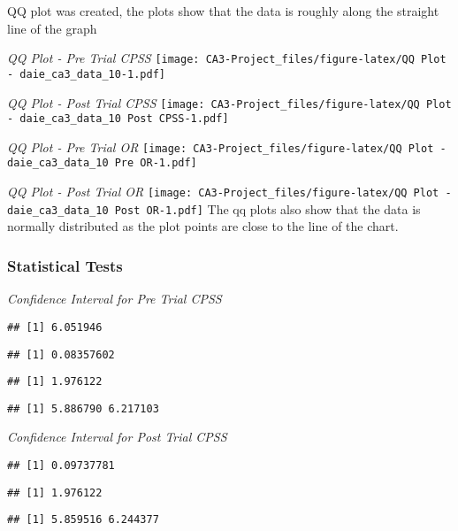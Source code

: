 \documentclass[
]{article}
\begin{document}
QQ plot was created, the plots show that the data is roughly along the
straight line of the graph

\emph{QQ Plot - Pre Trial CPSS}
\texttt{[image: CA3-Project\_files/figure-latex/QQ Plot - daie\_ca3\_data\_10-1.pdf]}

\emph{QQ Plot - Post Trial CPSS}
\texttt{[image: CA3-Project\_files/figure-latex/QQ Plot - daie\_ca3\_data\_10 Post CPSS-1.pdf]}

\emph{QQ Plot - Pre Trial OR}
\texttt{[image: CA3-Project\_files/figure-latex/QQ Plot - daie\_ca3\_data\_10 Pre OR-1.pdf]}

\emph{QQ Plot - Post Trial OR}
\texttt{[image: CA3-Project\_files/figure-latex/QQ Plot - daie\_ca3\_data\_10 Post OR-1.pdf]}
The qq plots also show that the data is normally distributed as the plot
points are close to the line of the chart.

\hypertarget{statistical-tests}{%
\subsubsection{\texorpdfstring{\textbf{Statistical
Tests}}{Statistical Tests}}\label{statistical-tests}}

\emph{Confidence Interval for Pre Trial CPSS}

\begin{verbatim}
## [1] 6.051946
\end{verbatim}

\begin{verbatim}
## [1] 0.08357602
\end{verbatim}

\begin{verbatim}
## [1] 1.976122
\end{verbatim}

\begin{verbatim}
## [1] 5.886790 6.217103
\end{verbatim}

\emph{Confidence Interval for Post Trial CPSS}

\begin{verbatim}
## [1] 0.09737781
\end{verbatim}

\begin{verbatim}
## [1] 1.976122
\end{verbatim}

\begin{verbatim}
## [1] 5.859516 6.244377
\end{verbatim}
\end{document}
